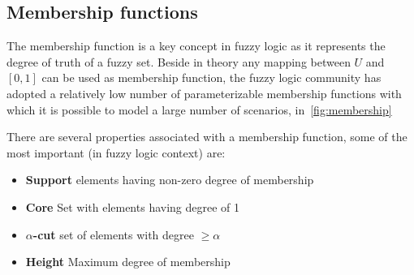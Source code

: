 \documentclass[]{article}
\begin{document}
\subsection{Membership functions}
The membership function is a key concept in fuzzy logic as it represents the
degree of truth of a fuzzy set. Beside in theory any mapping between $U$ and
$[0, 1]$ can be used as membership function, the fuzzy logic community has
adopted a relatively low number of parameterizable membership functions with
which it is possible to model a large number of scenarios, in~\autoref{fig:membership}


There are several properties associated with a membership function, some of the most important
(in fuzzy logic context) are:
\begin{itemize}
  \item{\textbf{Support} elements having non-zero degree of membership}
  \item{\textbf{Core} Set with elements having degree of 1}
  \item{\textbf{$\alpha$-cut} set of elements with degree $\geq\alpha$}
  \item{\textbf{Height} Maximum degree of membership}
\end{itemize}
\end{document}
